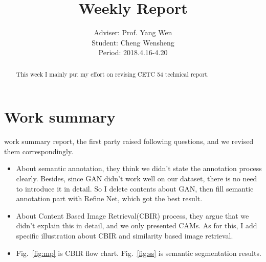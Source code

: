 \documentclass[]{IEEEtran}
\begin{document}
	\title{Weekly Report}
	\author{Adviser: Prof. Yang Wen \\Student: Cheng Wensheng\\ Period: 2018.4.16-4.20
	}
	\maketitle

\begin{abstract}
	This week I mainly put my effort on revising CETC 54 technical report.
\end{abstract}

\section{Work summary}
	 work summary report, the first party raised following questions, and we revised them correspondingly. 
	\begin{itemize}
		\item About semantic annotation, they think we didn't state the annotation process clearly. Besides, since GAN didn't work well on our dataset, there is no need to introduce it in detail. So I delete contents about GAN, then fill semantic annotation part with Refine Net, which got the best result.
		\item About Content Based Image Retrieval(CBIR) process, they argue that we didn't explain this in detail, and we only presented CAMs. As for this, I add specific illustration about CBIR and similarity based image retrieval.
		\item Fig.~\ref{fig:mp} is CBIR flow chart. Fig.~\ref{fig:ss} is semantic segmentation results.
	\end{itemize}

\end{document}

